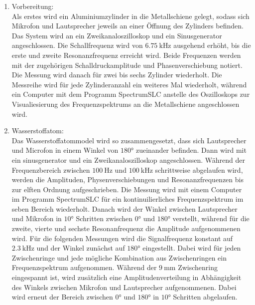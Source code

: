 \begin{enumerate}
    \item Vorbereitung:\\
        Als erstes wird ein Aluminiumzylinder in die Metallschiene gelegt, sodass 
        sich Mikrofon und Lautsprecher jeweils an einer Öffnung des Zylinders befinden.
        Das System wird an ein Zweikanaloszilloskop und ein Sinusgenerator angeschlossen. 
        Die Schallfrequenz
        wird von $\SI{6,75}{\kilo\hertz}$ ausgehend erhöht, bis die erste und 
        zweite Resonanzfrequenz 
        erreicht wird. Beide Frequenzen werden mit der zugehörigen Schalldruckamplitude und 
        Phasenverschiebung notiert. Die Messung wird danach für zwei bis sechs Zylinder 
        wiederholt. Die Messreihe wird für jede Zylinderanzahl ein weiteres Mal wiederholt,
        während ein Computer mit dem Programm SpectrumSLC anstelle des Oszilloskops zur Visualiesierung 
        des Frequenzspektrums an 
        die Metallschiene angeschlossen wird. 
    \item Wasserstoffatom:\\
        Das Wasserstoffatommodel wird so zusammengesetzt, dass sich Lautsprecher und Microfon
        in einem Winkel von $\num{180}°$ zueinander befinden. 
        Dann wird mit ein sinusgenerator und ein Zweikanaloszilloskop angeschlossen. 
        Während der Frequenzbereich zwischen $\SI{100}{\hertz}$ und $\SI{100}{\kilo\hertz}$
        schrittweise abgelaufen wird, werden die Amplituden, Physenverschiebungen und 
        Resonanzfrequenzen bis zur elften Ordnung aufgeschrieben. 
        Die Messung wird mit einem Computer im Programm SpectrumSLC für ein 
        kontinuilierliches Frequenzspektrum im seben Bereich wiederholt.
        Danach wird der Winkel zwischen Lautsprecher und Mikrofon in $\num{10}°$
        Schritten zwischen $\num{0}°$ und $\num{180}°$ verstellt, während
        für die zweite, vierte und sechste Resonanfrequenz die Amplitude aufgenommenen
        wird.
        Für die folgenden Messungen wird
        die Signalfrequenz konstant auf $\SI{2,3}{\kilo\hertz}$ und der Winkel 
        zunächst auf $\num{180}°$
        eingestellt. Dabei wird für jeden Zwischenringe und jede mögliche Kombination 
        aus Zwischenringen ein Frequenzspektrum aufgenommen.
        Während der $\SI{9}{\milli\meter}$ Zwischenring eingespannt ist, wird zusätzlich 
        eine Amplitudenverteilung in Abhängigkeit des Winkels zwischen Mikrofon und 
        Lautsprecher aufgenommenen. Dabei wird erneut der Bereich zwischen 
        $\num{0}°$ und $\num{180}°$ in $\num{10}°$ Schritten abgelaufen.

\end{enumerate}
